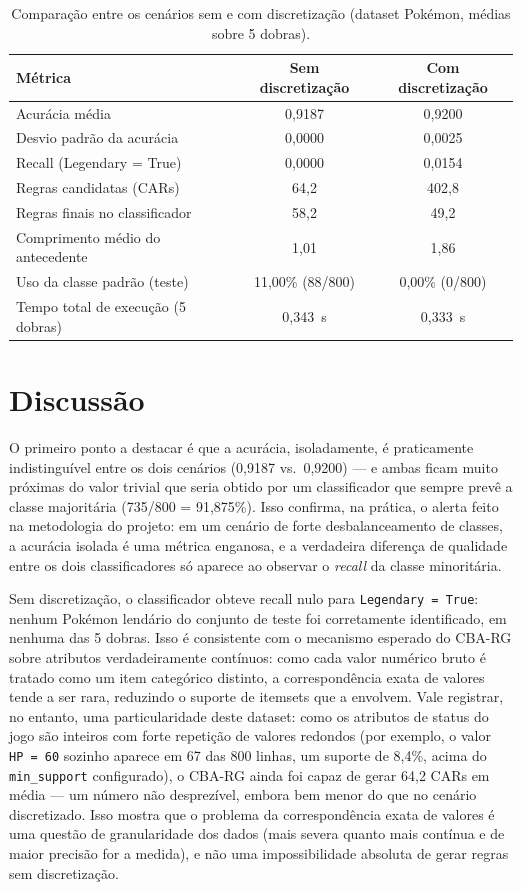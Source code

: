 \documentclass[a4paper,11pt]{article}
\begin{document}
\begin{table}[h]
\centering
\caption{Comparação entre os cenários sem e com discretização (dataset
Pokémon, médias sobre 5 dobras).}
\label{tab:resultados}
\begin{tabular}{lcc}
\toprule
\textbf{Métrica} & \textbf{Sem discretização} & \textbf{Com discretização} \\
\midrule
Acurácia média & 0,9187 & 0,9200 \\
Desvio padrão da acurácia & 0,0000 & 0,0025 \\
Recall (Legendary = True) & 0,0000 & 0,0154 \\
Regras candidatas (CARs) & 64,2 & 402,8 \\
Regras finais no classificador & 58,2 & 49,2 \\
Comprimento médio do antecedente & 1,01 & 1,86 \\
Uso da classe padrão (teste) & 11,00\% (88/800) & 0,00\% (0/800) \\
Tempo total de execução (5 dobras) & 0,343~s & 0,333~s \\
\bottomrule
\end{tabular}
\end{table}

\section{Discussão}

O primeiro ponto a destacar é que a acurácia, isoladamente, é praticamente
indistinguível entre os dois cenários (0,9187 vs.\ 0,9200) — e ambas ficam
muito próximas do valor trivial que seria obtido por um classificador que
sempre prevê a classe majoritária (735/800 = 91,875\%). Isso confirma, na
prática, o alerta feito na metodologia do projeto: em um cenário de forte
desbalanceamento de classes, a acurácia isolada é uma métrica enganosa, e a
verdadeira diferença de qualidade entre os dois classificadores só aparece
ao observar o \emph{recall} da classe minoritária.

Sem discretização, o classificador obteve recall nulo para
\texttt{Legendary = True}: nenhum Pokémon lendário do conjunto de teste foi
corretamente identificado, em nenhuma das 5 dobras. Isso é consistente com
o mecanismo esperado do CBA-RG sobre atributos verdadeiramente contínuos:
como cada valor numérico bruto é tratado como um item categórico distinto,
a correspondência exata de valores tende a ser rara, reduzindo o suporte de
itemsets que a envolvem. Vale registrar, no entanto, uma particularidade
deste dataset: como os atributos de status do jogo são inteiros com forte
repetição de valores redondos (por exemplo, o valor \texttt{HP\,=\,60}
sozinho aparece em 67 das 800 linhas, um suporte de 8,4\%, acima do
\texttt{min\_support} configurado), o CBA-RG ainda foi capaz de gerar 64,2
CARs em média — um número não desprezível, embora bem menor do que no
cenário discretizado. Isso mostra que o problema da correspondência exata
de valores é uma questão de granularidade dos dados (mais severa quanto
mais contínua e de maior precisão for a medida), e não uma impossibilidade
absoluta de gerar regras sem discretização.
\end{document}
